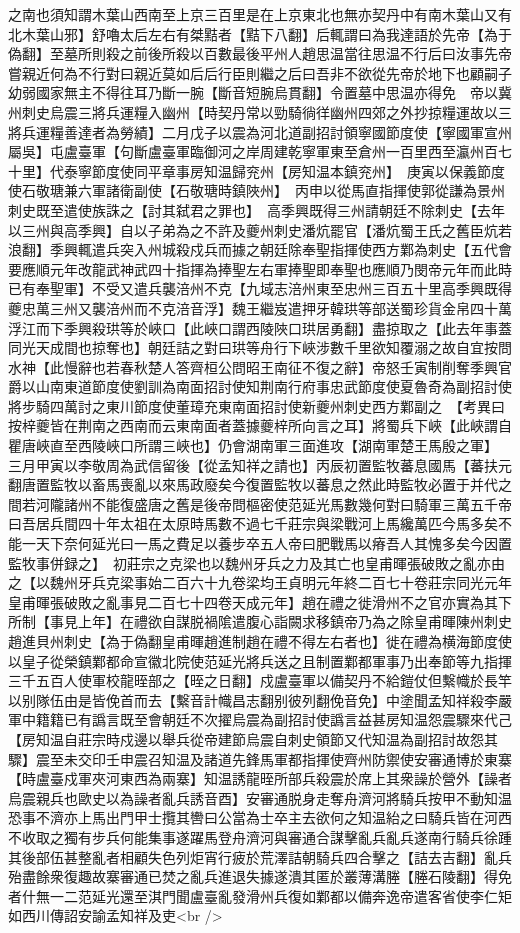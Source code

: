 之南也須知謂木葉山西南至上京三百里是在上京東北也無亦契丹中有南木葉山又有北木葉山邪】舒嚕太后左右有桀黠者【黠下八翻】后輒謂曰為我達語於先帝【為于偽翻】至墓所則殺之前後所殺以百數最後平州人趙思温當往思温不行后曰汝事先帝嘗親近何為不行對曰親近莫如后后行臣則繼之后曰吾非不欲從先帝於地下也顧嗣子幼弱國家無主不得往耳乃斷一腕【斷音短腕烏貫翻】令置墓中思温亦得免　帝以冀州刺史烏震三將兵運糧入幽州【時契丹常以勁騎徜徉幽州四郊之外抄掠糧運故以三將兵運糧善達者為勞績】二月戊子以震為河北道副招討領寧國節度使【寧國軍宣州屬吳】屯盧臺軍【句斷盧臺軍臨御河之岸周建乾寧軍東至倉州一百里西至瀛州百七十里】代泰寧節度使同平章事房知温歸兖州【房知温本鎮兖州】　庚寅以保義節度使石敬瑭兼六軍諸衛副使【石敬瑭時鎮陜州】　丙申以從馬直指揮使郭從謙為景州刺史既至遣使族誅之【討其弑君之罪也】　高季興既得三州請朝廷不除刺史【去年以三州與高季興】自以子弟為之不許及夔州刺史潘炕罷官【潘炕蜀王氏之舊臣炕若浪翻】季興輒遣兵突入州城殺戍兵而據之朝廷除奉聖指揮使西方鄴為刺史【五代會要應順元年改龍武神武四十指揮為捧聖左右軍捧聖即奉聖也應順乃閔帝元年而此時已有奉聖軍】不受又遣兵襲涪州不克【九域志涪州東至忠州三百五十里高季興既得夔忠萬三州又襲涪州而不克涪音浮】魏王繼岌遣押牙韓珙等部送蜀珍貨金帛四十萬浮江而下季興殺珙等於峽口【此峽口謂西陵陜口珙居勇翻】盡掠取之【此去年事蓋同光天成間也掠奪也】朝廷詰之對曰珙等舟行下峽涉數千里欲知覆溺之故自宜按問水神【此慢辭也若春秋楚人答齊桓公問昭王南征不復之辭】帝怒壬寅制削奪季興官爵以山南東道節度使劉訓為南面招討使知荆南行府事忠武節度使夏魯奇為副招討使將步騎四萬討之東川節度使董璋充東南面招討使新夔州刺史西方鄴副之　【考異曰按梓夔皆在荆南之西南而云東南面者蓋據夔梓所向言之耳】將蜀兵下峽【此峽謂自瞿唐峽直至西陵峽口所謂三峽也】仍會湖南軍三面進攻【湖南軍楚王馬殷之軍】　三月甲寅以李敬周為武信留後【從孟知祥之請也】丙辰初置監牧蕃息國馬【蕃扶元翻唐置監牧以畜馬喪亂以來馬政廢矣今復置監牧以蕃息之然此時監牧必置于并代之間若河隴諸州不能復盛唐之舊是後帝問樞密使范延光馬數幾何對曰騎軍三萬五千帝曰吾居兵間四十年太祖在太原時馬數不過七千莊宗與梁戰河上馬纔萬匹今馬多矣不能一天下奈何延光曰一馬之費足以養步卒五人帝曰肥戰馬以瘠吾人其愧多矣今因置監牧事併録之】　初莊宗之克梁也以魏州牙兵之力及其亡也皇甫暉張破敗之亂亦由之【以魏州牙兵克梁事始二百六十九卷梁均王貞明元年終二百七十卷莊宗同光元年皇甫暉張破敗之亂事見二百七十四卷天成元年】趙在禮之徙滑州不之官亦實為其下所制【事見上年】在禮欲自謀脱禍隂遣腹心詣闕求移鎮帝乃為之除皇甫暉陳州刺史趙進貝州刺史【為于偽翻皇甫暉趙進制趙在禮不得左右者也】徙在禮為横海節度使以皇子從榮鎮鄴都命宣徽北院使范延光將兵送之且制置鄴都軍事乃出奉節等九指揮三千五百人使軍校龍晊部之【晊之日翻】戍盧臺軍以備契丹不給鎧仗但繫幟於長竿以别隊伍由是皆俛首而去【繫音計幟昌志翻别彼列翻俛音免】中塗聞孟知祥殺李嚴軍中籍籍已有譌言既至會朝廷不次擢烏震為副招討使譌言益甚房知温怨震驟來代己【房知温自莊宗時戍邊以舉兵從帝建節烏震自刺史領節又代知温為副招討故怨其驟】震至未交印壬申震召知温及諸道先鋒馬軍都指揮使齊州防禦使安審通博於東寨【時盧臺戍軍夾河東西為兩寨】知温誘龍晊所部兵殺震於席上其衆譟於營外【譟者烏震親兵也歐史以為譟者亂兵誘音酉】安審通脱身走奪舟濟河將騎兵按甲不動知温恐事不濟亦上馬出門甲士攬其轡曰公當為士卒主去欲何之知温紿之曰騎兵皆在河西不收取之獨有步兵何能集事遂躍馬登舟濟河與審通合謀擊亂兵亂兵遂南行騎兵徐踵其後部伍甚整亂者相顧失色列炬宵行疲於荒澤詰朝騎兵四合擊之【詰去吉翻】亂兵殆盡餘衆復趣故寨審通已焚之亂兵進退失據遂潰其匿於叢薄溝塍【塍石陵翻】得免者什無一二范延光還至淇門聞盧臺亂發滑州兵復如鄴都以備奔逸帝遣客省使李仁矩如西川傳詔安諭孟知祥及吏<br />
